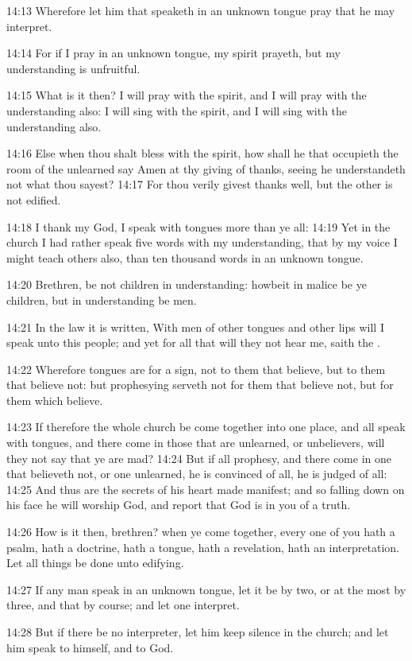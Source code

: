 14:13 Wherefore let him that speaketh in an unknown tongue pray that he may interpret.

14:14 For if I pray in an unknown tongue, my spirit prayeth, but my understanding is unfruitful.

14:15 What is it then? I will pray with the spirit, and I will pray with the understanding also: I will sing with the spirit, and I will sing with the understanding also.

14:16 Else when thou shalt bless with the spirit, how shall he that occupieth the room of the unlearned say Amen at thy giving of thanks, seeing he understandeth not what thou sayest?  14:17 For thou verily givest thanks well, but the other is not edified.

14:18 I thank my God, I speak with tongues more than ye all: 14:19 Yet in the church I had rather speak five words with my understanding, that by my voice I might teach others also, than ten thousand words in an unknown tongue.

14:20 Brethren, be not children in understanding: howbeit in malice be ye children, but in understanding be men.

14:21 In the law it is written, With men of other tongues and other lips will I speak unto this people; and yet for all that will they not hear me, saith the \LORD.

14:22 Wherefore tongues are for a sign, not to them that believe, but to them that believe not: but prophesying serveth not for them that believe not, but for them which believe.

14:23 If therefore the whole church be come together into one place, and all speak with tongues, and there come in those that are unlearned, or unbelievers, will they not say that ye are mad?  14:24 But if all prophesy, and there come in one that believeth not, or one unlearned, he is convinced of all, he is judged of all: 14:25 And thus are the secrets of his heart made manifest; and so falling down on his face he will worship God, and report that God is in you of a truth.

14:26 How is it then, brethren? when ye come together, every one of you hath a psalm, hath a doctrine, hath a tongue, hath a revelation, hath an interpretation. Let all things be done unto edifying.

14:27 If any man speak in an unknown tongue, let it be by two, or at the most by three, and that by course; and let one interpret.

14:28 But if there be no interpreter, let him keep silence in the church; and let him speak to himself, and to God.

